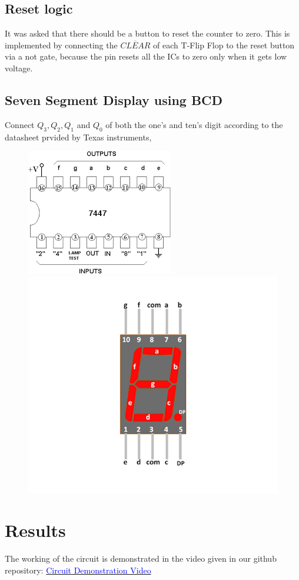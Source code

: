 \documentclass[a4paper,12pt]{article}
\begin{document}
\subsection*{Reset logic}
It was asked that there should be a button to reset the counter to zero. This is implemented by connecting the $\overline{CLEAR}$ of each T-Flip Flop to the reset button via a not gate, because
the pin resets all the ICs to zero only when it gets low voltage.
\subsection*{Seven Segment Display using BCD}
Connect $Q_3, Q_2, Q_1$ and $Q_0$ of both the one's and ten's digit according to the datasheet prvided by Texas instruments,
\begin{figure}[H]
  {\includegraphics[width=0.5\linewidth]{bcd.png}}
  \hspace{\hfill}
  {\includegraphics[width=0.5\linewidth]{7seg.png}}
\end{figure}
\section*{Results}
The working of the circuit is demonstrated in the video given in our github repository:
\newline
\href{}{\textcolor{blue}{Circuit Demonstration Video}}
\end{document}
